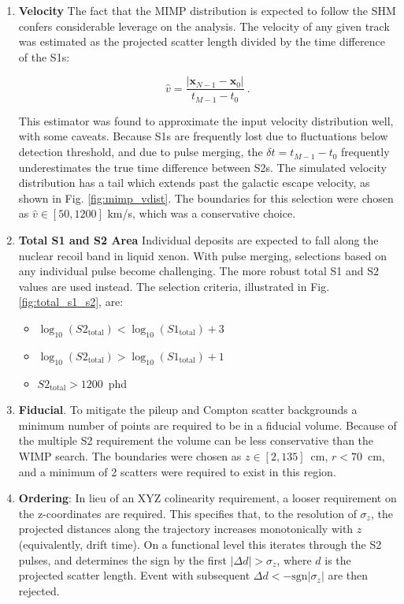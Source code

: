 \begin{enumerate}
    \item \textbf{Velocity} The fact that the MIMP distribution is expected to follow the SHM \cite{mccabe_earths_2014} confers considerable leverage on the analysis. 
    The velocity of any given track was estimated as the projected scatter length divided by the time difference of the S1s:
    
    \begin{equation}
        \hat v = \frac{|\mathbf{x}_{N-1} - \mathbf{x}_0|}{t_{M-1} - t_0}~.
    \end{equation}
    
    This estimator was found to approximate the input velocity distribution well, with some caveats.
    Because S1s are frequently lost due to fluctuations below detection threshold, and due to pulse merging, the $\delta t = t_{M-1} - t_0$ frequently underestimates the true time difference between S2s.
    The simulated velocity distribution has a tail which extends past the galactic escape velocity, as shown in Fig. \ref{fig:mimp_vdist}.
    The boundaries for this selection were chosen as $\hat v \in [50, 1200]$ km/s, which was a conservative choice.
    \item \textbf{Total S1 and S2 Area} Individual deposits are expected to fall along the nuclear recoil band in liquid xenon.
    With pulse merging, selections based on any individual pulse become challenging. The more robust total S1 and S2 values are used instead.
    The selection criteria, illustrated in Fig. \ref{fig:total_s1_s2}, are: 
    \begin{itemize}
        \item $\log_{10} (S2_{\text{total}}) < \log_{10} (S1_{\text{total}}) + 3 $
         \item $\log_{10} (S2_{\text{total}}) > \log_{10} (S1_{\text{total}}) + 1 $
        \item $S2_{\mathrm{total}} > 1200 $~phd

    \end{itemize}
    \item \textbf{Fiducial}. To mitigate the pileup and Compton scatter backgrounds a minimum number of points are required to be in a fiducial volume. 
    Because of the multiple S2 requirement the volume can be less conservative than the WIMP search.
    The boundaries were chosen as $z \in [2, 135]$~cm, $r < 70$~cm, and a minimum of 2 scatters were required to exist in this region.
    
    \item \textbf{Ordering}: In lieu of an XYZ colinearity requirement, a looser requirement on the z-coordinates are required. 
    This specifies that, to the resolution of $\sigma_z$, the projected distances along the trajectory increases monotonically with $z$(equivalently, drift time).
    On a functional level this iterates through the S2 pulses, and determines the sign by the first $|\Delta d| > \sigma_z$, where $d$ is the projected scatter length. 
    Event with subsequent $\Delta d < - \text{sgn}|\sigma_z|$ are then rejected.
    

\end{enumerate}
